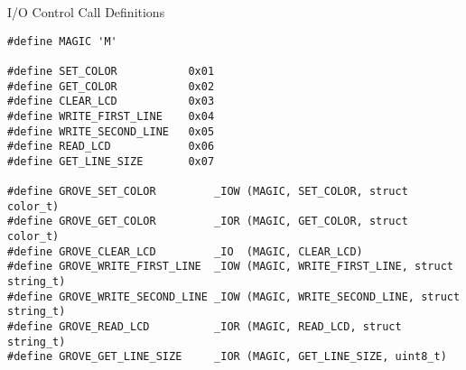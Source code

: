 \begin{listing} [H]
    \caption{I/O Control Call Definitions}
    \label{lst:ioctldefs}
    \begin{verbatim}
#define MAGIC 'M'

#define SET_COLOR           0x01
#define GET_COLOR           0x02
#define CLEAR_LCD           0x03
#define WRITE_FIRST_LINE    0x04
#define WRITE_SECOND_LINE   0x05
#define READ_LCD            0x06
#define GET_LINE_SIZE       0x07

#define GROVE_SET_COLOR         _IOW (MAGIC, SET_COLOR, struct color_t) 
#define GROVE_GET_COLOR         _IOR (MAGIC, GET_COLOR, struct color_t)
#define GROVE_CLEAR_LCD         _IO  (MAGIC, CLEAR_LCD)
#define GROVE_WRITE_FIRST_LINE  _IOW (MAGIC, WRITE_FIRST_LINE, struct string_t)
#define GROVE_WRITE_SECOND_LINE _IOW (MAGIC, WRITE_SECOND_LINE, struct string_t)
#define GROVE_READ_LCD          _IOR (MAGIC, READ_LCD, struct string_t)
#define GROVE_GET_LINE_SIZE     _IOR (MAGIC, GET_LINE_SIZE, uint8_t)
    \end{verbatim}
\end{listing}

